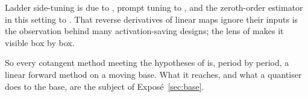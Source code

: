 Ladder side-tuning is due to \citet{sung2022lst}, prompt tuning to \citet{lester2021power}, and the zeroth-order
estimator in this setting to \citet{malladi2023fine}. That reverse derivatives of linear maps ignore their inputs is the
observation behind many activation-saving designs; the lens of \citet{cruttwell2021categorical} makes it visible box by
box.

So every cotangent method meeting the hypotheses of  is, period by period, a linear forward
method on a moving base. What it reaches, and what a quantiser does to the base, are the subject of
Exposé~\ref{sec:base}.
